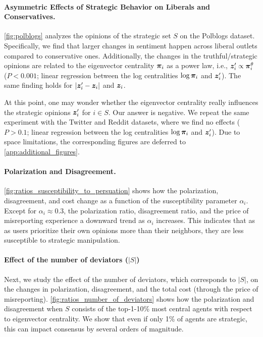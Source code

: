 \paragraph{Asymmetric Effects of Strategic Behavior on Liberals and Conservatives.} \cref{fig:polblogs} analyzes the opinions of the strategic set $S$ on the Polblogs dataset. Specifically, we find that larger changes in sentiment happen across liberal outlets compared to conservative ones. Additionally, the changes in the truthful/strategic opinions are related to the eigenvector centrality $\bm{\pi}_i$ as a power law, i.e., $\bm{z}_i' \propto \bm{\pi}_i^{\theta}$ ($P < 0.001$; linear regression between the log centralities $\log \bm{\pi}_i$ and $\bm{z}_i'$). The same finding holds for $|\bm{z}_i' - \bm{z}_i|$ and $\bm{z}_i$. 

At this point, one may wonder whether the eigenvector centrality really influences the strategic opinions $\bm{z}_i'$ for $i \in S$. Our answer is negative. We repeat the same experiment with the Twitter and Reddit datasets, where we find no effects ($P > 0.1$; linear regression between the log centralities $\log \bm{\pi}_i$ and $\bm{z}_i'$). Due to space limitations, the corresponding figures are deferred to \cref{app:additional_figures}. 

\paragraph{Polarization and Disagreement.} \cref{fig:ratios_susceptibility_to_persuation} shows how the polarization, disagreement, and cost change as a function of the susceptibility parameter $\alpha_i$. Except for $\alpha_i \approx 0.3$, the polarization ratio, disagreement ratio, and the price of misreporting experience a downward trend as $\alpha_i$ increases. This indicates that as as users prioritize their own opinions more than their neighbors, they are less susceptible to strategic manipulation.

\paragraph{Effect of the number of deviators ($|S|$)} Next, we study the effect of the number of deviators, which corresponds to $|S|$, on the changes in polarization, disagreement, and the total cost (through the price of misreporting). \cref{fig:ratios_number_of_deviators} shows how the polarization and disagreement when $S$ consists of the top-1-10\% most central agents with respect to eigenvector centrality. We show that even if only 1\% of agents are strategic, this can impact consensus by several orders of magnitude. 

